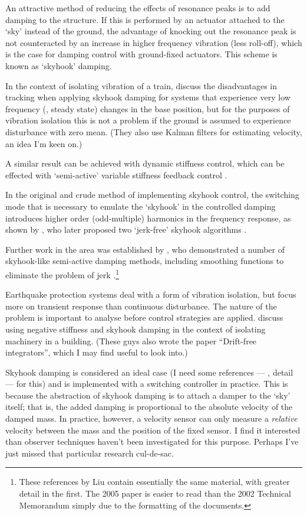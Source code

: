 An attractive method of reducing the effects of resonance peaks is to add
damping to the structure. If this is performed by an actuator attached to the
`sky' instead of the ground, the advantage of knocking out the resonance peak
is not counteracted by an increase in higher frequency vibration (less
roll-off), which is the case for damping control with ground-fixed actuators.
This scheme is known as `skyhook' damping.

In the context of isolating vibration of a train, \textcite{li1999} discuss
the disadvantages in tracking when applying skyhook damping for systems that
experience very low frequency (\ie, steady state) changes in the base
position, but for the purposes of vibration isolation this is not a problem if
the ground is assumed to experience disturbance with zero mean. (They also use
Kalman filters for estimating velocity, an idea I'm keen on.)

A similar result  can be achieved with dynamic stiffness control,
which can be effected with `semi-active' variable stiffness feedback control
\cite{leavitt2007}.

In the original and crude method of implementing skyhook control, the
switching mode that is necessary to emulate the `skyhook' in the controlled
damping introduces higher order (odd-multiple) harmonics in the frequency
response, as shown by \textcite{ahmadian2001}, who later proposed two
`jerk-free' skyhook algorithms \cite{ahmadian2004}.

Further work in the area was established by \textcite{liu2002}, who
demonstrated a number of skyhook-like semi-active damping methods, including
smoothing functions to eliminate the problem of jerk
\cite{liu2005}.\footnote{These references by Liu contain essentially the same
material, with greater detail in the first. The 2005 paper is easier to read
than the 2002 Technical Memorandum simply due to the formatting of the
documents.}

Earthquake protection systems deal with a form of vibration isolation,
but focus more on transient response than continuous disturbance. The
nature of the problem is important to analyse before control
strategies are applied. \textcite{gavin2007} discuss using negative
stiffness and skyhook damping in the context of isolating machinery
in a building. (These guys also wrote the paper ``Drift-free
integrators'', which I may find useful to look into.)

Skyhook damping is considered an ideal case (I need some references
— \ie, detail — for this) and is implemented with a switching
controller in practice. This is because the abstraction of skyhook
damping is to attach a damper to the `sky' itself; that is, the added
damping is proportional to the absolute velocity of the damped
mass. In practice, however, a velocity sensor can only measure a
\emph{relative} velocity between the mass and the position of the
fixed sensor. I find it interested than observer techniques haven't
been investigated for this purpose. Perhaps I've just missed that
particular research cul-de-sac.

